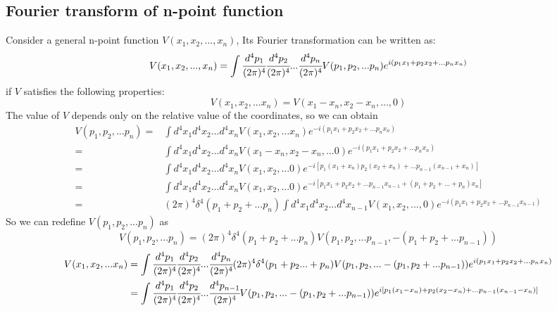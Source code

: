 \documentclass[UTF8]{article}
\begin{document}
\begin{appendices}
\section{Fourier transform of n-point function}
Consider a general n-point function $V(x_1,x_2,...,x_n)$,
Its Fourier transformation can be written as:
\begin{equation}
V(x_1,x_2,...,x_n)=\int\cfrac{d^4p_1}{(2\pi)^4}
\cfrac{d^4p_2}{(2\pi)^4}...\cfrac{d^4p_n}{(2\pi)^4}
V(p_1,p_2,...p_n)e^{i(p_1x_1+p_2x_2+...p_nx_n)}
\end{equation}
if $V$ satisfies the following properties:
\begin{equation}
V(x_1,x_2,...x_n)=V(x_1-x_n,x_2-x_n,...,0)
\end{equation}
The value of $V$ depends only on the relative value of the coordinates, 
so we can obtain
\begin{equation}
\begin{split}
V(p_1,p_2,...p_n)=&\int d^4x_1d^4x_2...d^4x_nV(x_1,x_2,...x_n)
e^{-i(p_1x_1+p_2x_2+...p_nx_n)}\\
=&\int d^4x_1d^4x_2...d^4x_nV(x_1-x_n,x_2-x_n,...0)
e^{-i(p_1x_1+p_2x_2+...p_nx_n)}\\
=&\int d^4x_1d^4x_2...d^4x_nV(x_1,x_2,...0)
e^{-i[p_1(x_1+x_n)p_2(x_2+x_n)+...p_{n-1}(x_{n-1}+x_n)]}\\
=&\int d^4x_1d^4x_2...d^4x_nV(x_1,x_2,...0)
e^{-i[p_1x_1+p_2x_2+...p_{n-1}x_{n-1}+(p_1+p_2+...+p_n)x_n]}\\
=&(2\pi)^4\delta^4(p_1+p_2+...p_n)\int d^4x_1d^4x_2...d^4x_{n-1}
V(x_1,x_2,...,0)e^{-i(p_1x_1+p_2x_2+...p_{n-1}x_{n-1})}
\end{split}
\end{equation}
So we can redefine $V(p_1,p_2,...p_n)$ as
\begin{equation}
V(p_1,p_2,...p_n)=(2\pi)^4\delta^4(p_1+p_2+...p_n)
V(p_1,p_2,...p_{n-1},-(p_1+p_2+...p_{n-1}))
\end{equation}
\begin{equation}
\begin{split}
V(x_1,x_2,...x_n)
&=\int\cfrac{d^4p_1}{(2\pi)^4}\cfrac{d^4p_2}{(2\pi)^4}...
\cfrac{d^4p_n}{(2\pi)^4}(2\pi)^4\delta^4(p_1+p_2...+p_n)
V(p_1,p_2,...-(p_1,p_2+...p_{n-1}))e^{i(p_1x_1+p_2x_2+...p_nx_n)}\\
&=\int\cfrac{d^4p_1}{(2\pi)^4}\cfrac{d^4p_2}{(2\pi)^4}...
\cfrac{d^4p_{n-1}}{(2\pi)^4}V(p_1,p_2,...-(p_1,p_2+...p_{n-1}))
e^{i[p_1(x_1-x_n)+p_2(x_2-x_n)+...p_{n-1}(x_{n-1}-x_n)]}
\end{split}
\end{equation}
\end{appendices}
\end{document}
